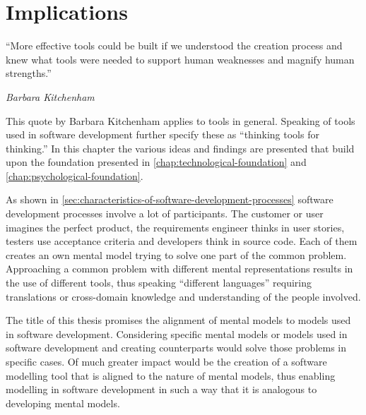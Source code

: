 \chapter{Implications}
\label{chap:possible-applications}
\epigraph{``More effective tools could be built if we understood the creation process and knew what tools were needed to support human weaknesses and magnify human strengths.''}{\textit{Barbara Kitchenham}}
\noindent
This quote by Barbara Kitchenham applies to tools in general.
Speaking of tools used in software development \textcite{kitchenham_research_1990} further specify these as ``thinking tools for thinking.''
In this chapter the various ideas and findings are presented that build upon the foundation presented in \cref{chap:technological-foundation} and \cref{chap:psychological-foundation}.

As shown in \cref{sec:characteristics-of-software-development-processes} software development processes involve a lot of participants.
The customer or user imagines the perfect product, the requirements engineer thinks in user stories, testers use acceptance criteria and developers think in source code.
Each of them creates an own mental model trying to solve one part of the common problem.
Approaching a common problem with different mental representations results in the use of different tools, thus speaking ``different languages'' requiring translations or cross-domain knowledge and understanding of the people involved.

The title of this thesis promises the alignment of mental models to models used in software development.
Considering specific mental models or models used in software development and creating counterparts would solve those problems in specific cases.
Of much greater impact would be the creation of a software modelling tool that is aligned to the nature of mental models, thus enabling modelling in software development in such a way that it is analogous to developing mental models.


